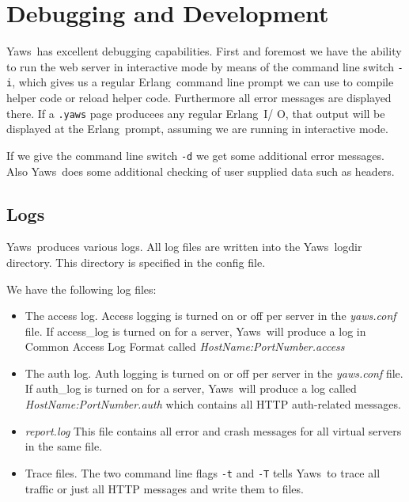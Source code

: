 \documentclass[11pt,oneside,english]{book}
\newcommand{\Erlang}            %
        {{\sc Erlang}}
\newcommand{\Yaws}            %
        {{\sc Yaws}}
\begin{document}
\chapter{Debugging and Development}

\Yaws\ has excellent debugging capabilities. First and foremost we
have the ability to run the web server in interactive mode by means of
the command line switch \verb+-i+, which gives us a regular
\Erlang\ command line prompt we can use to compile helper code or
reload helper code. Furthermore all error messages are displayed
there.  If a \verb+.yaws+ page producees any regular \Erlang\ I\slash
O, that output will be displayed at the \Erlang\ prompt, assuming we
are running in interactive mode.

If we give the command line switch \verb+-d+ we get some additional
error messages. Also \Yaws\ does some additional checking of user
supplied data such as headers.

\section{Logs}
\Yaws\ produces various logs. All log files are written into the
\Yaws\ logdir directory. This directory is specified in the config
file.

We have the following log files:

\begin{itemize}
\item The access log. Access logging is turned on or off per server in
  the \textit{yaws.conf} file. If access\_log is turned on for a
  server, \Yaws\ will produce a log in Common Access Log Format called
  \textit{HostName:PortNumber.access}

\item The auth log. Auth logging is turned on or off per server in the
  \textit{yaws.conf} file. If auth\_log is turned on for a server,
  \Yaws\ will produce a log called \textit{HostName:PortNumber.auth}
  which contains all HTTP auth-related messages.

\item \textit{report.log} This file contains all error and crash
  messages for all virtual servers in the same file.

\item Trace files. The two command line flags \verb+-t+ and \verb+-T+ tells
\Yaws\ to trace all traffic or just all HTTP messages and write them to files.
\end{itemize}
\end{document}
